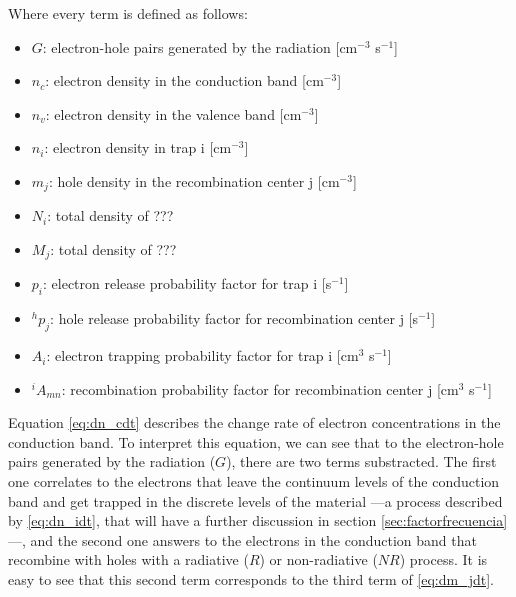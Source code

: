 \vspace{15pt}
Where every term is defined as follows:
\begin{itemize}[itemsep=0.2cm,parsep=0cm]
  \item $G$: electron-hole pairs generated by the radiation [cm$^{-3}$ s$^{-1}$]
  \item $n_c$: electron density in the conduction band [cm$^{-3}$]
  \item $n_v$: electron density in the valence band [cm$^{-3}$]
  \item $n_i$: electron density in trap i [cm$^{-3}$]
  \item $m_j$: hole density in the recombination center j [cm$^{-3}$]
  \item $N_i$: total density of ???
  \item $M_j$: total density of ???
  \item $p_i$: electron release probability factor for trap i [s$^{-1}$]
  \item $^hp_j$: hole release probability factor for recombination center j [s$^{-1}$]
  \item $A_i$: electron trapping probability factor for trap i [cm$^{3}$ s$^{-1}$]
  \item $^iA_{mn}$: recombination probability factor for recombination center j [cm$^{3}$ s$^{-1}$]
\end{itemize}

\vspace{10pt}

Equation \ref{eq:dn_cdt} describes the change rate of electron concentrations in the conduction band. To interpret this equation, we can see that to the electron-hole pairs generated by the radiation ($G$), there are two terms substracted. The first one correlates to the electrons that leave the continuum levels of the conduction band and get trapped in the discrete levels of the material ---a process described by \ref{eq:dn_idt}, that will have a further discussion in section \ref{sec:factorfrecuencia}---, and the second one answers to the electrons in the conduction band that recombine with holes with a radiative ($R$) or non-radiative ($N\!R$) process. It is easy to see that this second term corresponds to the third term of \ref{eq:dm_jdt}. 

